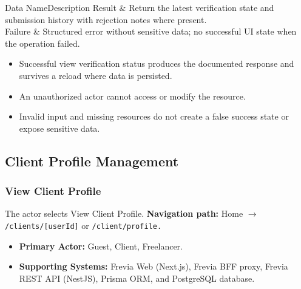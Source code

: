 \begin{specdatatable}{Data Name}{Description}
Result & Return the latest verification state and submission history with rejection notes where present.\\ \hline
Failure & Structured error without sensitive data; no successful UI state when the operation failed.\\ \hline
\end{specdatatable}

\begin{itemize}[leftmargin=1.6em,topsep=3pt,itemsep=2pt,parsep=0pt,label=$\bullet$]
    \item Successful view verification status produces the documented response and survives a reload where data is persisted.
    \item An unauthorized actor cannot access or modify the resource.
    \item Invalid input and missing resources do not create a false success state or expose sensitive data.
\end{itemize}


\subsection{Client Profile Management}

\subsubsection{View Client Profile}

The actor selects View Client Profile.\newline
\textbf{Navigation path:} Home $\rightarrow$ \texttt{/\allowbreak{}clients/\allowbreak{}[userId]} or \texttt{/\allowbreak{}client/\allowbreak{}profile.}


\begin{itemize}[leftmargin=1.6em,topsep=3pt,itemsep=2pt,parsep=0pt,label=$\bullet$]
    \item \textbf{Primary Actor:} Guest, Client, Freelancer.
    \item \textbf{Supporting Systems:} Frevia Web (Next.js), Frevia BFF proxy, Frevia REST API (NestJS), Prisma ORM, and PostgreSQL database.
\end{itemize}

